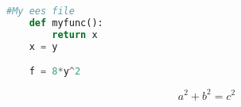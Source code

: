 \begin{lstlisting}[language=Python]
    #My ees file
    def myfunc():
        return x
    x = y

    f = 8*y^2
\end{lstlisting}



\newcommand{\myeqnone}{%
a^2 + b^2 = c^2
}

\begin{equation}
    \myeqnone
    \label{myeqnonelabel}
\end{equation}